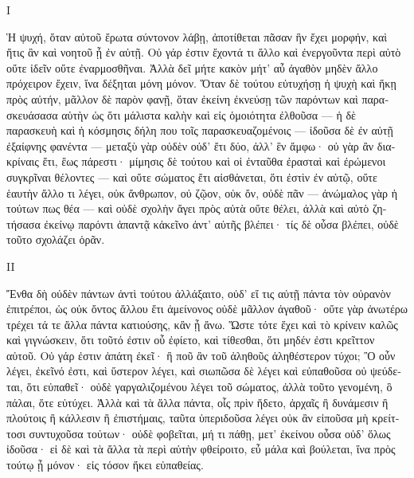 \medskip


{\large
{ \noindent I

\begin{greek}

\noindent  Ἡ ψυχή, ὅταν αὐτοῦ ἔρωτα σύντονον λάβῃ, ἀποτίθεται πᾶσαν ἣν ἔχει μορφήν, καὶ ἥτις ἂν καὶ νοητοῦ ᾖ ἐν αὐτῇ. Οὐ γάρ ἐστιν ἔχοντά τι ἄλλο καὶ ἐνεργοῦντα περὶ αὐτὸ οὔτε ἰδεῖν οὔτε ἐναρμοσθῆναι. Ἀλλὰ δεῖ μήτε κακὸν μήτ' αὖ ἀγαθὸν μηδὲν ἄλλο πρόχειρον ἔχειν, ἵνα δέξηται μόνη μόνον. Ὅταν δὲ τούτου εὐτυχήσῃ ἡ ψυχὴ καὶ ἥκῃ πρὸς αὐτήν, μᾶλλον δὲ παρὸν φανῇ, ὅταν ἐκείνη ἐκνεύσῃ τῶν παρόντων καὶ παρασκευάσασα αὑτὴν ὡς ὅτι μάλιστα καλὴν καὶ εἰς ὁμοιότητα ἐλθοῦσα — ἡ δὲ παρασκευὴ καὶ ἡ κόσμησις δήλη που τοῖς παρασκευαζομένοις — ἰδοῦσα δὲ ἐν αὐτῇ ἐξαίφνης φανέντα — μεταξὺ γὰρ οὐδὲν οὐδ' ἔτι δύο, ἀλλ' ἓν ἄμφω· οὐ γὰρ ἂν διακρίναις ἔτι, ἕως πάρεστι· μίμησις δὲ τούτου καὶ οἱ ἐνταῦθα ἐρασταὶ καὶ ἐρώμενοι συγκρῖναι θέλοντες — καὶ οὔτε σώματος ἔτι αἰσθάνεται, ὅτι ἐστὶν ἐν αὐτῷ, οὔτε ἑαυτὴν ἄλλο τι λέγει, οὐκ ἄνθρωπον, οὐ ζῷον, οὐκ ὄν, οὐδὲ πᾶν — ἀνώμαλος γὰρ ἡ τούτων πως θέα — καὶ οὐδὲ σχολὴν ἄγει πρὸς αὐτὰ οὔτε θέλει, ἀλλὰ καὶ αὐτὸ ζητήσασα ἐκείνῳ παρόντι ἀπαντᾷ κἀκεῖνο ἀντ' αὐτῆς βλέπει· τίς δὲ οὖσα βλέπει, οὐδὲ τοῦτο σχολάζει ὁρᾶν.

\end{greek}

\noindent II

\begin{greek}

\noindent  Ἔνθα δὴ οὐδὲν πάντων ἀντὶ τούτου ἀλλάξαιτο, οὐδ' εἴ τις αὐτῇ πάντα τὸν οὐρανὸν ἐπιτρέποι, ὡς οὐκ ὄντος ἄλλου ἔτι ἀμείνονος οὐδὲ μᾶλλον ἀγαθοῦ· οὔτε γὰρ ἀνωτέρω τρέχει τά τε ἄλλα πάντα κατιούσης, κἂν ᾖ ἄνω.  Ὥστε τότε ἔχει καὶ τὸ κρίνειν καλῶς καὶ γιγνώσκειν, ὅτι τοῦτό ἐστιν οὗ ἐφίετο, καὶ τίθεσθαι, ὅτι μηδέν ἐστι κρεῖττον αὐτοῦ. Οὐ γάρ ἐστιν ἀπάτη ἐκεῖ· ἢ ποῦ ἂν τοῦ ἀληθοῦς ἀληθέστερον τύχοι;  Ὃ οὖν λέγει, ἐκεῖνό ἐστι, καὶ ὕστερον λέγει, καὶ σιωπῶσα δὲ λέγει καὶ εὐπαθοῦσα οὐ ψεύδεται, ὅτι εὐπαθεῖ· οὐδὲ γαργαλιζομένου λέγει τοῦ σώματος, ἀλλὰ τοῦτο γενομένη, ὃ πάλαι, ὅτε εὐτύχει. Ἀλλὰ καὶ τὰ ἄλλα πάντα, οἷς πρὶν ἥδετο, ἀρχαῖς ἢ δυνάμεσιν ἢ πλούτοις ἢ κάλλεσιν ἢ ἐπιστήμαις, ταῦτα ὑπεριδοῦσα λέγει οὐκ ἂν εἰποῦσα μὴ κρείττοσι συντυχοῦσα τούτων· οὐδὲ φοβεῖται, μή τι πάθῃ, μετ' ἐκείνου οὖσα οὐδ' ὅλως ἰδοῦσα· εἰ δὲ καὶ τὰ ἄλλα τὰ περὶ αὐτὴν φθείροιτο, εὖ μάλα καὶ βούλεται, ἵνα πρὸς τούτῳ ᾖ μόνον· εἰς τόσον ἥκει εὐπαθείας.

\end{greek}

}
}


